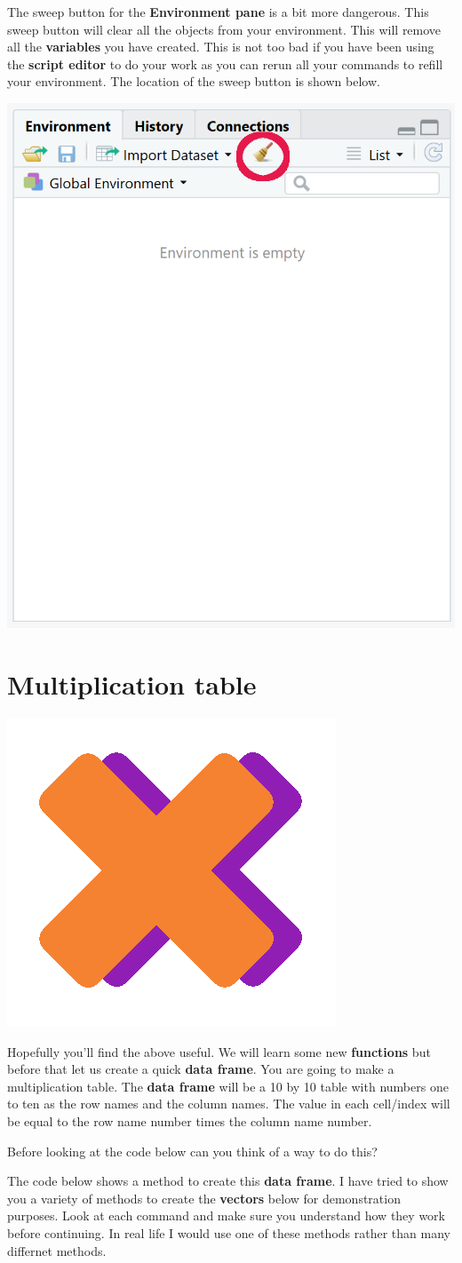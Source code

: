 \documentclass[]{book}
\begin{document}
The sweep button for the \textbf{Environment pane} is a bit more
dangerous. This sweep button will clear all the objects from your
environment. This will remove all the \textbf{variables} you have
created. This is not too bad if you have been using the \textbf{script
editor} to do your work as you can rerun all your commands to refill
your environment. The location of the sweep button is shown below.

\begin{center}\includegraphics[width=0.4\linewidth]{figures/RStudio_env_sweep} \end{center}

\section{Multiplication table}\label{multiplication-table}

\begin{center}\includegraphics[width=0.2\linewidth]{figures/multiplication} \end{center}

Hopefully you'll find the above useful. We will learn some new
\textbf{functions} but before that let us create a quick \textbf{data
frame}. You are going to make a multiplication table. The \textbf{data
frame} will be a 10 by 10 table with numbers one to ten as the row names
and the column names. The value in each cell/index will be equal to the
row name number times the column name number.

Before looking at the code below can you think of a way to do this?

The code below shows a method to create this \textbf{data frame}. I have
tried to show you a variety of methods to create the \textbf{vectors}
below for demonstration purposes. Look at each command and make sure you
understand how they work before continuing. In real life I would use one
of these methods rather than many differnet methods.
\end{document}
